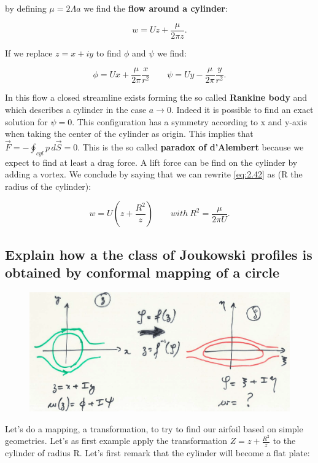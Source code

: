 \documentclass[british,french,11pt, a4paper, openany]{article}
\begin{document}
by defining $\mu = 2\Lambda a$ we find the \textbf{flow around a cylinder}:

\begin{equation}
w = Uz + \frac{\mu }{2\pi z}.
\label{eq:2.42}
\end{equation}

If we replace $z= x+iy$ to find $\phi$ and $\psi$ we find:

\begin{equation}
\phi = Ux + \frac{\mu}{2\pi }\frac{x}{r^2} \qquad \psi = Uy - \frac{\mu }{2\pi} \frac{y}{r^2}.
\end{equation}

In this flow a closed streamline exists forming the so called \textbf{Rankine body} and which describes a cylinder in the case $a\rightarrow 0$. Indeed it is possible to find an exact solution for $\psi = 0$. This configuration has a symmetry according to x and y-axis when taking the center of the cylinder as origin. This implies that $\vec{F} = - \oint _{cyl} p\, d\vec{S} = 0$. This is the so called \textbf{paradox of d'Alembert} because we expect to find at least a drag force. A lift force can be find on the cylinder by adding a vortex. We conclude by saying that we can rewrite \eqref{eq:2.42} as (R the radius of the cylinder):

\begin{equation}
w = U\left( z + \frac{R^2}{z} \right) \qquad with \ R^2 = \frac{\mu }{2\pi U}.
\end{equation}

\subsection{Explain how a the class of Joukowski profiles is obtained by conformal
	mapping of a circle}
\begin{figure}
	\vspace{-5mm}
	\includegraphics[scale=0.1]{ch2/28}
\end{figure}
Let's do a mapping, a transformation, to try to find our airfoil based on simple geometries. Let's as first example apply the transformation $Z = z + \frac{R^2}{z}$ to the cylinder of radius R. Let's first remark that the cylinder will become a flat plate:
\end{document}
